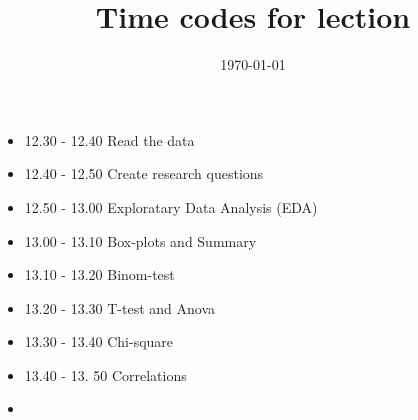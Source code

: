 \documentclass[a4paper,14pt]{article}
\title{Time codes for lection}
\date{\today}
\begin{document}
		
\maketitle

	\begin{itemize}
		\item 12.30 - 12.40 Read the data
		\item 12.40 - 12.50 Create research questions
		\item 12.50 - 13.00 Exploratary Data Analysis (EDA)
		\item 13.00 - 13.10 Box-plots and Summary 
		\item 13.10 - 13.20 Binom-test
		\item 13.20 - 13.30 T-test and Anova
		\item 13.30 - 13.40 Chi-square
		\item 13.40 - 13. 50 Correlations
		\item 
	\end{itemize}
\end{document}
